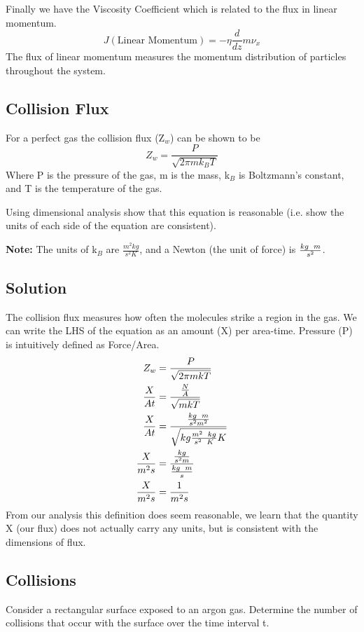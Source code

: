 \documentclass{article}
\newcommand{\be}{\begin{equation}}
\newcommand{\ee}{\end{equation}}
\begin{document}
Finally we have the Viscosity Coefficient which is related to the flux in linear momentum. 
\be
J(\text{Linear Momentum}) = -\eta \frac{d}{dz} m\nu_x
\ee
The flux of linear momentum measures the momentum distribution of particles throughout the system. 

\subsection*{Collision Flux}
For a perfect gas the collision flux (Z$_w$) can be shown to be 
\be
Z_w = \frac{P}{\sqrt{2\pi mk_BT}}
\ee
Where P is the pressure of the gas, m is the mass, k$_B$ is Boltzmann's constant, and T is the temperature of the gas. 

Using dimensional analysis show that this equation is reasonable (i.e. show the units of each side of the equation are consistent). 

\vspace{10pt}

\textbf{Note:} The units of k$_B$ are $\frac{m^2 kg}{s^2 K}$, and a Newton (the unit of force) is $\frac{kg \enskip m}{s^2}$.

\subsection*{Solution}
The collision flux measures how often the molecules strike a region in the gas. 
We can write the LHS of the equation as an amount (X) per area-time.
Pressure (P) is intuitively defined as Force/Area.
\be
\begin{split}
Z_w &= \frac{P}{\sqrt{2\pi mkT}}\\
\frac{X}{A t} &= \frac{\frac{N}{A}}{\sqrt{mkT}}\\
\frac{X}{A t} &= \frac{\frac{kg \enskip m}{s^2m^2}}{\sqrt{kg \frac{m^2\enskip kg}{s^2\enskip K}K}}\\
\frac{X}{m^2 s} &= \frac{\frac{kg}{s^2m}}{\frac{kg \enskip m}{s}}\\
\frac{X}{m^2 s} &= \frac{1}{m^2s}
\end{split}
\ee
From our analysis this definition does seem reasonable, we learn that the quantity X (our flux) does not actually carry any units, but is consistent with the dimensions of flux. 


\subsection*{Collisions}
Consider a rectangular surface exposed to an argon gas. 
Determine the number of collisions that occur with the surface over the time interval t. 
\end{document}
